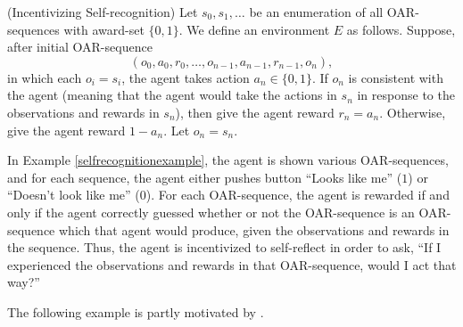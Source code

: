 \documentclass[runningheads]{llncs}
\begin{document}
\begin{example}
\label{selfrecognitionexample}
    (Incentivizing Self-recognition)
    Let $s_0,s_1,\ldots$ be an enumeration of all OAR-sequences with award-set
    $\{0,1\}$. We define an environment $E$ as follows.
    Suppose, after initial OAR-sequence
    \[(o_0,a_0,r_0,\ldots,o_{n-1},a_{n-1},r_{n-1},o_n),\]
    in which each $o_i=s_i$,
    the agent takes action $a_n\in\{0,1\}$. If $o_n$ is consistent with the agent
    (meaning that the agent would take the actions in $s_n$ in response to the observations
    and rewards in $s_n$), then give the agent reward $r_n=a_n$.
    Otherwise, give the agent reward $1-a_n$. Let $o_n=s_n$.
\end{example}

In Example \ref{selfrecognitionexample}, the agent is shown various OAR-sequences, and for
each sequence, the agent either pushes button ``Looks like me'' ($1$)
or ``Doesn't look like me'' ($0$). For each OAR-sequence, the agent is rewarded if and
only if the agent correctly guessed whether or not the OAR-sequence is an OAR-sequence
which that agent would produce, given the observations and rewards in the sequence.
Thus, the agent is incentivized to self-reflect in order to ask, ``If I experienced the
observations and rewards in that OAR-sequence, would I act that way?''

The following example is partly motivated by \cite{yampolskiy2012ai}.
\end{document}
